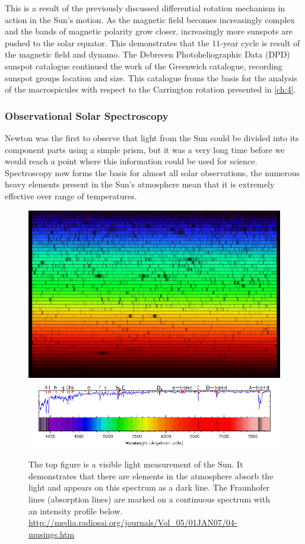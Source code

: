 This is a result of the previously discussed differential rotation mechanism in action in the Sun's motion.
As the magnetic field becomes increasingly complex and the bands of magnetic polarity grow closer, increasingly more sunspots are pushed to the solar equator.
This demonstrates that the $11$-year cycle is result of the magnetic field and dynamo.
The Debrecen Photoheliographic Data (DPD) sunspot catalogue continued the work of the Greenwich catalogue, recording sunspot groups location and size.
This catalogue froms the basis for the analysis of the macrospicules with respect to the Carrington rotation presented in \ref{ch:4}.


\subsubsection{Observational Solar Spectroscopy}

Newton was the first to observe that light from the Sun could be divided into its component parts using a simple prism, but it was a very long time before we would reach a point where this information could be used for science.
Spectroscopy now forms the basis for almost all solar observations, the numerous heavy elements present in the Sun's atmosphere mean that it is extremely effective over range of temperatures.

\begin{figure}
	\centering
	\includegraphics[width=\linewidth]{Chapter1/Figs/sun_spectrum}
	\includegraphics[width=\linewidth]{Chapter1/Figs/fraunhofer_lines}
	\caption{The top figure is a visible light measurement of the Sun. It demonstrates that there are elements in the atmosphere absorb the light and appears on this spectrum as a dark line. The Fraunhofer lines (absorption lines) are marked on a continuous spectrum with an intensity profile below.
	\url{http://media.radiosai.org/journals/Vol_05/01JAN07/04-musings.htm}}
	\label{fig:fraunhofer}
\end{figure}


